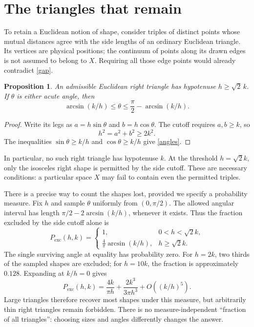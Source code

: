 \documentclass[11pt]{article}
\newtheorem{proposition}{Proposition}
\begin{document}
\section{The triangles that remain}
To retain a Euclidean notion of shape, consider triples of distinct points whose mutual distances agree with the side lengths of an ordinary Euclidean triangle. Its vertices are physical positions; the continuum of points along its drawn edges is not assumed to belong to $X$. Requiring all those edge points would already contradict \eqref{gap}.

\begin{proposition}\label{tri}
An admissible Euclidean right triangle has hypotenuse $h\geq\sqrt{2}\,k$. If $\theta$ is either acute angle, then
\begin{equation}\label{angles}
\arcsin(k/h)\leq\theta\leq\frac{\pi}{2}-\arcsin(k/h).
\end{equation}
\end{proposition}
\begin{proof}
Write its legs as $a=h\sin\theta$ and $b=h\cos\theta$. The cutoff requires $a,b\geq k$, so
\begin{equation}
h^2=a^2+b^2\geq2k^2.
\end{equation}
The inequalities $\sin\theta\geq k/h$ and $\cos\theta\geq k/h$ give \eqref{angles}.
\end{proof}
In particular, no such right triangle has hypotenuse $k$. At the threshold $h=\sqrt{2}k$, only the isosceles right shape is permitted by the side cutoff. These are necessary conditions: a particular space $X$ may fail to contain even the permitted triples.

There is a precise way to count the shapes lost, provided we specify a probability measure. Fix $h$ and sample $\theta$ uniformly from $(0,\pi/2)$. The allowed angular interval has length $\pi/2-2\arcsin(k/h)$, whenever it exists. Thus the fraction excluded by the side cutoff alone is
\begin{equation}\label{fraction}
P_{\mathrm{exc}}(h,k)=
\begin{cases}
1,&0<h<\sqrt{2}k,\\[2pt]
\displaystyle\frac{4}{\pi}\arcsin(k/h),&h\geq\sqrt{2}k.
\end{cases}
\end{equation}
The single surviving angle at equality has probability zero. For $h=2k$, two thirds of the sampled shapes are excluded; for $h=10k$, the fraction is approximately $0.128$. Expanding at $k/h=0$ gives
\begin{equation}
P_{\mathrm{exc}}(h,k)=\frac{4k}{\pi h}
+\frac{2k^3}{3\pi h^3}+O\!\left((k/h)^5\right).
\end{equation}
Large triangles therefore recover most shapes under this measure, but arbitrarily thin right triangles remain forbidden. There is no measure-independent ``fraction of all triangles'': choosing sizes and angles differently changes the answer.
\end{document}

